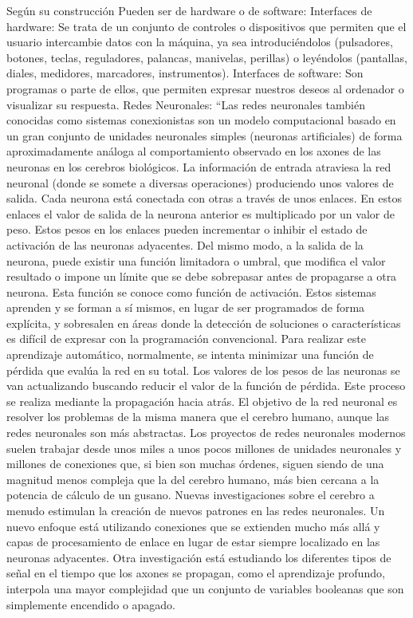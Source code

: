 		Según su construcción Pueden ser de hardware o de software:
		Interfaces de hardware: Se trata de un conjunto de controles o dispositivos que permiten que el usuario intercambie datos con la máquina, ya sea introduciéndolos (pulsadores, botones, teclas, reguladores, palancas, manivelas, perillas) o leyéndolos (pantallas, diales, medidores, marcadores, instrumentos).
		Interfaces de software: Son programas o parte de ellos, que permiten expresar nuestros deseos al ordenador o visualizar su respuesta.
		Redes Neuronales: “Las redes neuronales también conocidas como sistemas conexionistas son un modelo computacional basado en un gran conjunto de unidades neuronales simples (neuronas artificiales) de forma aproximadamente análoga al comportamiento observado en los axones de las neuronas en los cerebros biológicos. La información de entrada atraviesa la red neuronal (donde se somete a diversas operaciones) produciendo unos valores de salida.
		Cada neurona está conectada con otras a través de unos enlaces. En estos enlaces el valor de salida de la neurona anterior es multiplicado por un valor de peso. Estos pesos en los enlaces pueden incrementar o inhibir el estado de activación de las neuronas adyacentes. Del mismo modo, a la salida de la neurona, puede existir una función limitadora o umbral, que modifica el valor resultado o impone un límite que se debe sobrepasar antes de propagarse a otra neurona. Esta función se conoce como función de activación.
		Estos sistemas aprenden y se forman a sí mismos, en lugar de ser programados de forma explícita, y sobresalen en áreas donde la detección de soluciones o características es difícil de expresar con la programación convencional. Para realizar este aprendizaje automático, normalmente, se intenta minimizar una función de pérdida que evalúa la red en su total. Los valores de los pesos de las neuronas se van actualizando buscando reducir el valor de la función de pérdida. Este proceso se realiza mediante la propagación hacia atrás.
		El objetivo de la red neuronal es resolver los problemas de la misma manera que el cerebro humano, aunque las redes neuronales son más abstractas. Los proyectos de redes neuronales modernos suelen trabajar desde unos miles a unos pocos millones de unidades neuronales y millones de conexiones que, si bien son muchas órdenes, siguen siendo de una magnitud menos compleja que la del cerebro humano, más bien cercana a la potencia de cálculo de un gusano.
		Nuevas investigaciones sobre el cerebro a menudo estimulan la creación de nuevos patrones en las redes neuronales. Un nuevo enfoque está utilizando conexiones que se extienden mucho más allá y capas de procesamiento de enlace en lugar de estar siempre localizado en las neuronas adyacentes. Otra investigación está estudiando los diferentes tipos de señal en el tiempo que los axones se propagan, como el aprendizaje profundo, interpola una mayor complejidad que un conjunto de variables booleanas que son simplemente encendido o apagado.
